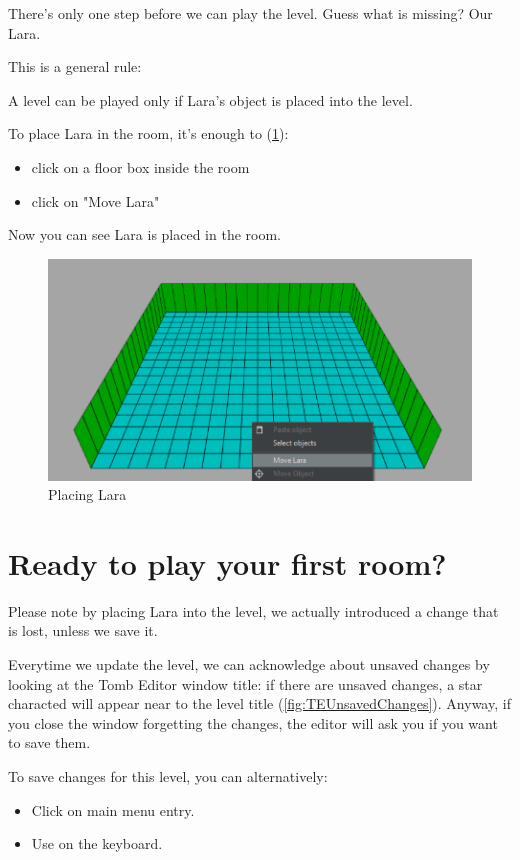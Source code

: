 There's only one step before we can play the level. Guess what is missing? Our Lara.
\par This is a general rule:
\begin{remark}
A level can be played only if Lara's object is placed into the level.
\end{remark}
To place Lara in the room, it's enough to (\ref{fig:temovelara}):
\begin{itemize}
    \item {} click on a floor box inside the room
    \item click on "Move Lara"
\end{itemize}
Now you can see Lara is placed in the room.

\begin{figure}
    \centering
     \includegraphics[width=1\textwidth]{screenshots/1001.png}
     \caption{Placing Lara}
     \label{fig:temovelara} 
\end{figure}

\section{Ready to play your first room?}
Please note by placing Lara into the level, we actually introduced a change that is lost, unless we save it.
\par Everytime we update the level, we can acknowledge about unsaved changes by looking at the Tomb Editor window title: if there are unsaved changes, a star characted will appear near to the level title (\ref{fig:TEUnsavedChanges}). Anyway, if you close the window forgetting the changes, the editor will ask you if you want to save them.
\par To save changes for this level, you can alternatively:
\begin{itemize}
    \item Click on  main menu entry.
    \item Use  on the keyboard.
\end{itemize}

